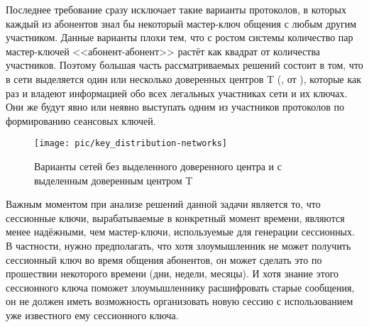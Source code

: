 Последнее требование сразу исключает такие варианты протоколов, в которых каждый из абонентов знал бы некоторый мастер-ключ общения с любым другим участником. Данные варианты плохи тем, что с ростом системы количество пар мастер-ключей <<абонент-абонент>> растёт как квадрат от количества участников. Поэтому большая часть рассматриваемых решений состоит в том, что в сети выделяется один или несколько доверенных центров T (, от ), которые как раз и владеют информацией обо всех легальных участниках сети и их ключах. Они же будут явно или неявно выступать одним из участников протоколов по формированию сеансовых ключей.

\begin{figure}[!htb]
    \centering
    \texttt{[image: pic/key\_distribution-networks]}
    \caption{Варианты сетей без выделенного доверенного центра и с выделенным доверенным центром T\label{fig:key_distribution-networks}}
\end{figure}

Важным моментом при анализе решений данной задачи является то, что сессионные ключи, вырабатываемые в конкретный момент времени, являются менее надёжными, чем мастер-ключи, используемые для генерации сессионных. В частности, нужно предполагать, что хотя злоумышленник не может получить сессионный ключ во время общения абонентов, он может сделать это по прошествии некоторого времени (дни, недели, месяцы). И хотя знание этого сессионного ключа поможет злоумышленнику расшифровать старые сообщения, он не должен иметь возможность организовать новую сессию с использованием уже известного ему сессионного ключа.








